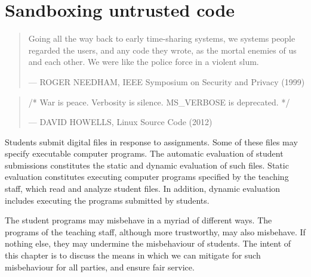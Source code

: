 
\chapter{Sandboxing untrusted code}

\begin{quotation}

\footnotesize\sffamily\itshape

\begin{flushright}

Going all the way back to early time-sharing systems, we systems people
regarded the users, and any code they wrote, as the mortal enemies of us and
each other. We were like the police force in a violent slum.

\smallbreak

\upshape

--- ROGER NEEDHAM, IEEE Symposium on Security and Privacy (1999)

\end{flushright}

\end{quotation}

\begin{quotation}

\footnotesize\sffamily\itshape

\begin{flushright}

/* War is peace. Verbosity is silence. MS\_VERBOSE is deprecated. */

\smallbreak

\upshape

--- DAVID HOWELLS, Linux Source Code (2012)

\end{flushright}

\end{quotation}

Students submit digital files in response to assignments. Some of these files
may specify executable computer programs. The automatic evaluation of student
submissions constitutes the static and dynamic evaluation of such files. Static
evaluation constitutes executing computer programs specified by the teaching
staff, which read and analyze student files. In addition, dynamic evaluation
includes executing the programs submitted by students.

The student programs may misbehave in a myriad of different ways. The programs
of the teaching staff, although more trustworthy, may also misbehave. If
nothing else, they may undermine the misbehaviour of students. The intent of
this chapter is to discuss the means in which we can mitigate for such
misbehaviour for all parties, and ensure fair service.

